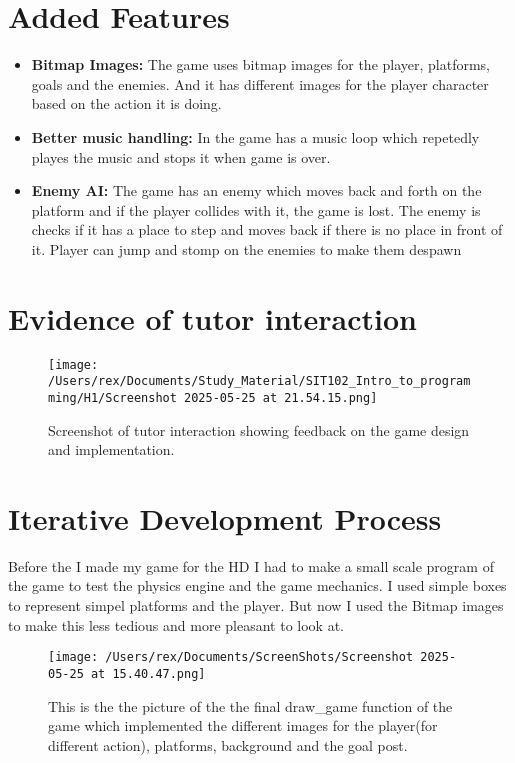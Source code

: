 \documentclass[11pt]{article}
\begin{document}
\section{Added Features}
\begin{itemize}
    \item \textbf{Bitmap Images:} The game uses bitmap images for the player, platforms, goals and the enemies. And it has different images for the player character based on the action it is doing.
    \item \textbf{Better music handling:} In the game has a music loop which repetedly playes the music and stops it when game is over.
    \item \textbf{Enemy AI:} The game has an enemy which moves back and forth on the platform and if the player collides with it, the game is lost. The enemy is checks if it has a place to step and moves back if there is no place in front of it. Player can jump and stomp on the enemies to make them despawn  
\end{itemize}

\section{Evidence of tutor interaction}
\begin{figure}[!ht]
    \centering
    \texttt{[image: /Users/rex/Documents/Study\_Material/SIT102\_Intro\_to\_programming/H1/Screenshot 2025-05-25 at 21.54.15.png]}
    \caption{Screenshot of tutor interaction showing feedback on the game design and implementation.}
\end{figure}

\section{Iterative Development Process}

Before the I made my game for the HD I had to make a small scale program of the game to test the physics engine and the game mechanics. I used simple boxes to represent simpel platforms and the player. But now I used the Bitmap images to make this less tedious and more pleasant to look at. 
\begin{figure}[!ht]
    \centering
    \texttt{[image: /Users/rex/Documents/ScreenShots/Screenshot 2025-05-25 at 15.40.47.png]}
    \caption{This is the the picture of the the final draw\_game function of the game which implemented the different images for the player(for different action), platforms, background and the goal post.}
\end{figure}
\end{document}
